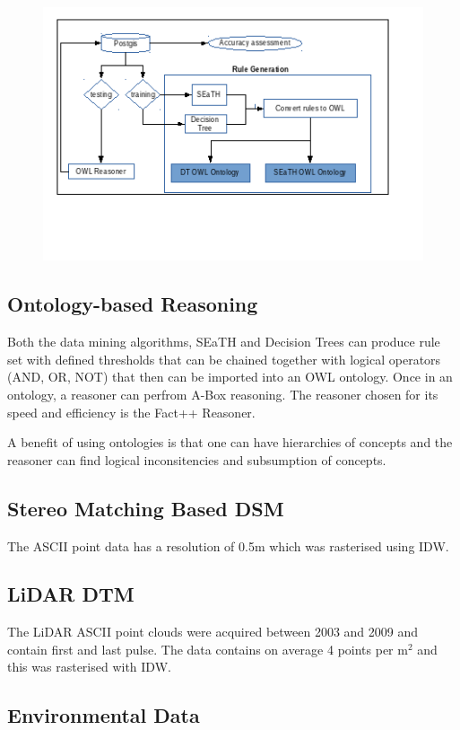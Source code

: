 \documentclass[authoryear, review,12pt,number]{elsarticle}
\begin{document}
\begin{figure}
	\includegraphics[width=\textwidth]{diagrams/workflow_training_testing2.png}
\end{figure}
\subsection{Ontology-based Reasoning}
Both the data mining algorithms, SEaTH and Decision Trees can produce rule
set with defined thresholds that can be chained together with logical operators
(AND, OR, NOT) that then can be imported into an OWL ontology. Once in an
ontology, a reasoner can perfrom A-Box reasoning. The reasoner chosen for its
speed and efficiency is the Fact++ Reasoner.

A benefit of using ontologies is that one can have hierarchies of concepts and
the reasoner can find logical inconsitencies and subsumption of concepts.
\subsection{Stereo Matching Based DSM}
The ASCII point data has a resolution of 0.5m which was rasterised using IDW.
\subsection{LiDAR DTM}
The LiDAR ASCII point clouds were acquired between 2003 and 2009 and contain
first and last pulse. The data contains on average 4 points per m$^{2}$ and
this was rasterised with IDW.
%

\subsection{Environmental Data}
\end{document}
